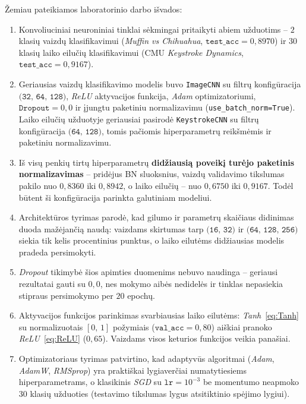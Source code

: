 \label{sec:isvados}

Žemiau pateikiamos laboratorinio darbo išvados:
\begin{enumerate}
    \item Konvoliuciniai neuroniniai tinklai sėkmingai pritaikyti abiem užduotims – $2$ klasių vaizdų klasifikavimui (\textit{Muffin vs Chihuahua}, $\texttt{test\_acc}=0{,}8970$) ir $30$ klasių laiko eilučių klasifikavimui (CMU \textit{Keystroke Dynamics}, $\texttt{test\_acc}=0{,}9167$).
    
    \item Geriausias vaizdų klasifikavimo modelis buvo \texttt{ImageCNN} su filtrų konfigūracija $\texttt{(32, 64, 128)}$, \textit{ReLU} aktyvacijos funkcija, \textit{Adam} optimizatoriumi, $\texttt{Dropout}=0{,}0$ ir įjungtu paketiniu normalizavimu (\texttt{use\_batch\_norm=True}). Laiko eilučių užduotyje geriausiai pasirodė \texttt{KeystrokeCNN} su filtrų konfigūracija $\texttt{(64, 128)}$, tomis pačiomis hiperparametrų reikšmėmis ir paketiniu normalizavimu.
    
    \item Iš visų penkių tirtų hiperparametrų \textbf{didžiausią poveikį turėjo paketinis normalizavimas} – pridėjus BN sluoksnius, vaizdų validavimo tikslumas pakilo nuo $0{,}8360$ iki $0{,}8942$, o laiko eilučių – nuo $0{,}6750$ iki $0{,}9167$. Todėl būtent ši konfigūracija parinkta galutiniam modeliui.
    
    \item Architektūros tyrimas parodė, kad gilumo ir parametrų skaičiaus didinimas duoda mažėjančią naudą: vaizdams skirtumas tarp $\texttt{(16, 32)}$ ir $\texttt{(64, 128, 256)}$ siekia tik kelis procentinius punktus, o laiko eilutėms didžiausias modelis pradeda persimokyti.
    
    \item \textit{Dropout} tikimybė šios apimties duomenims nebuvo naudinga – geriausi rezultatai gauti su $0{,}0$, nes mokymo aibės nedidelės ir tinklas nepasiekia stipraus persimokymo per $20$ epochų.
    
    \item Aktyvacijos funkcijos parinkimas svarbiausias laiko eilutėms: \textit{Tanh}~\eqref{eq:Tanh} su normalizuotais $[0,\,1]$ požymiais ($\texttt{val\_acc}=0{,}80$) aiškiai pranoko \textit{ReLU}~\eqref{eq:ReLU} ($0{,}65$). Vaizdams visos keturios funkcijos veikia panašiai.
    
    \item Optimizatoriaus tyrimas patvirtino, kad adaptyvūs algoritmai (\textit{Adam}, \textit{AdamW}, \textit{RMSprop}) yra praktiškai lygiaverčiai numatytiesiems hiperparametrams, o klasikinis \textit{SGD} su $\texttt{lr}=10^{-3}$ be momentumo neapmoko $30$ klasių užduoties (testavimo tikslumas lygus atsitiktinio spėjimo lygiui).
    

\end{enumerate}
